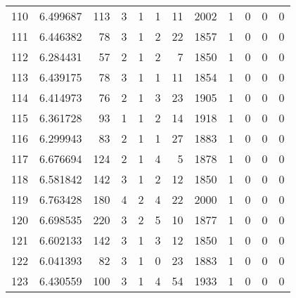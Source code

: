 \begin{tabular}{lrrrrrrrrrrr}
110 &  6.499687 &  113 &      3 &        1 &      1 &              11 &  2002 &               1 &               0 &               0 &               0 \\
111 &  6.446382 &   78 &      3 &        1 &      2 &              22 &  1857 &               1 &               0 &               0 &               0 \\
112 &  6.284431 &   57 &      2 &        1 &      2 &               7 &  1850 &               1 &               0 &               0 &               0 \\
113 &  6.439175 &   78 &      3 &        1 &      1 &              11 &  1854 &               1 &               0 &               0 &               0 \\
114 &  6.414973 &   76 &      2 &        1 &      3 &              23 &  1905 &               1 &               0 &               0 &               0 \\
115 &  6.361728 &   93 &      1 &        1 &      2 &              14 &  1918 &               1 &               0 &               0 &               0 \\
116 &  6.299943 &   83 &      2 &        1 &      1 &              27 &  1883 &               1 &               0 &               0 &               0 \\
117 &  6.676694 &  124 &      2 &        1 &      4 &               5 &  1878 &               1 &               0 &               0 &               0 \\
118 &  6.581842 &  142 &      3 &        1 &      2 &              12 &  1850 &               1 &               0 &               0 &               0 \\
119 &  6.763428 &  180 &      4 &        2 &      4 &              22 &  2000 &               1 &               0 &               0 &               0 \\
120 &  6.698535 &  220 &      3 &        2 &      5 &              10 &  1877 &               1 &               0 &               0 &               0 \\
121 &  6.602133 &  142 &      3 &        1 &      3 &              12 &  1850 &               1 &               0 &               0 &               0 \\
122 &  6.041393 &   82 &      3 &        1 &      0 &              23 &  1883 &               1 &               0 &               0 &               0 \\
123 &  6.430559 &  100 &      3 &        1 &      4 &              54 &  1933 &               1 &               0 &               0 &               0 \\

\end{tabular}
